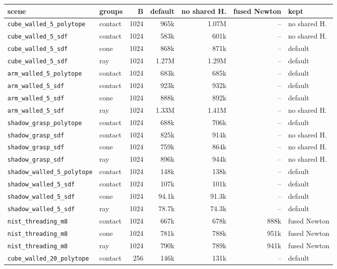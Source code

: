 \begin{longtable}{@{}llrrrrl@{}}
\toprule
scene & groups & B & default & no shared H. & fused Newton & kept \\
\midrule
\endhead
\texttt{cube\_walled\_5\_polytope} & contact & 1024 & 965k & 1.07M & -- & no shared H. \\
\texttt{cube\_walled\_5\_sdf} & contact & 1024 & 583k & 601k & -- & no shared H. \\
\texttt{cube\_walled\_5\_sdf} & cone & 1024 & 868k & 871k & -- & default \\
\texttt{cube\_walled\_5\_sdf} & ray & 1024 & 1.27M & 1.29M & -- & default \\
\texttt{arm\_walled\_5\_polytope} & contact & 1024 & 683k & 685k & -- & default \\
\texttt{arm\_walled\_5\_sdf} & contact & 1024 & 923k & 932k & -- & default \\
\texttt{arm\_walled\_5\_sdf} & cone & 1024 & 888k & 892k & -- & default \\
\texttt{arm\_walled\_5\_sdf} & ray & 1024 & 1.33M & 1.41M & -- & no shared H. \\
\texttt{shadow\_grasp\_polytope} & contact & 1024 & 688k & 706k & -- & default \\
\texttt{shadow\_grasp\_sdf} & contact & 1024 & 825k & 914k & -- & no shared H. \\
\texttt{shadow\_grasp\_sdf} & cone & 1024 & 759k & 864k & -- & no shared H. \\
\texttt{shadow\_grasp\_sdf} & ray & 1024 & 896k & 944k & -- & no shared H. \\
\texttt{shadow\_walled\_5\_polytope} & contact & 1024 & 148k & 138k & -- & default \\
\texttt{shadow\_walled\_5\_sdf} & contact & 1024 & 107k & 101k & -- & default \\
\texttt{shadow\_walled\_5\_sdf} & cone & 1024 & 94.1k & 91.3k & -- & default \\
\texttt{shadow\_walled\_5\_sdf} & ray & 1024 & 78.7k & 74.3k & -- & default \\
\texttt{nist\_threading\_m8} & contact & 1024 & 667k & 678k & 888k & fused Newton \\
\texttt{nist\_threading\_m8} & cone & 1024 & 781k & 788k & 951k & fused Newton \\
\texttt{nist\_threading\_m8} & ray & 1024 & 790k & 789k & 941k & fused Newton \\
\texttt{cube\_walled\_20\_polytope} & contact & 256 & 146k & 131k & -- & default \\

\end{longtable}
